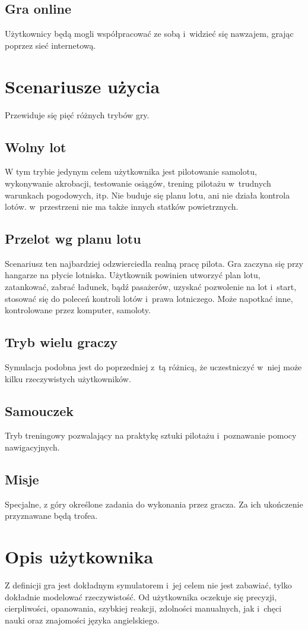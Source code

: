 \documentclass{mwrep}
\begin{document}
\subsection{Gra online}
Użytkownicy będą mogli współpracować ze sobą i~widzieć się nawzajem, grając poprzez sieć internetową.

\section{Scenariusze użycia}
Przewiduje się pięć różnych trybów gry.
\subsection{Wolny lot}
W tym trybie jedynym celem użytkownika jest pilotowanie samolotu, wykonywanie akrobacji, testowanie osiągów, trening pilotażu w~trudnych warunkach pogodowych, itp. Nie buduje się planu lotu, ani nie działa kontrola lotów. w~przestrzeni nie ma także innych statków powietrznych.
\subsection{Przelot wg planu lotu}
Scenariusz ten najbardziej odzwierciedla realną pracę pilota. Gra zaczyna się przy hangarze na płycie lotniska. Użytkownik powinien utworzyć plan lotu, zatankować, zabrać ładunek, bądź pasażerów, uzyskać pozwolenie na lot i~start, stosować się do poleceń kontroli lotów i~prawa lotniczego. Może napotkać inne, kontrolowane przez komputer, samoloty.
\subsection{Tryb wielu graczy}
Symulacja podobna jest do poprzedniej z~tą różnicą, że uczestniczyć w~niej może kilku rzeczywistych użytkowników.
\subsection{Samouczek}
Tryb treningowy pozwalający na praktykę sztuki pilotażu i~poznawanie pomocy nawigacyjnych.
\subsection{Misje}
Specjalne, z góry określone zadania do wykonania przez gracza. Za ich ukończenie przyznawane będą trofea.

\section{Opis użytkownika}
Z definicji gra jest dokładnym symulatorem i~jej celem nie jest zabawiać, tylko dokładnie modelować rzeczywistość. Od użytkownika oczekuje się precyzji, cierpliwości, opanowania, szybkiej reakcji, zdolności manualnych, jak i~chęci nauki oraz znajomości języka angielskiego.
\end{document}
